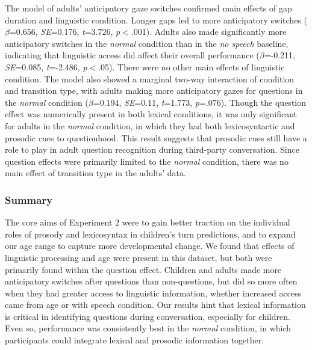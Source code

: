 \documentclass[authoryear, 12pt]{elsarticle}
\begin{document}
The model of adults' anticipatory gaze switches confirmed main effects of gap duration and linguistic condition. Longer gaps led to more anticipatory switches (\textit{$\beta$}=0.656, \textit{SE}=0.176, \textit{t}=3.726, \textit{p}$<$.001). Adults also made significantly more anticipatory switches in the \textit{normal} condition than in the \textit{no speech} baseline, indicating that linguistic access did affect their overall performance (\textit{$\beta$}=-0.211, \textit{SE}=0.085, \textit{t}=-2.486, \textit{p}$<$.05). There were no other main effects of linguistic condition. The model also showed a marginal two-way interaction of condition and transition type, with adults making more anticipatory gazes for questions in the \textit{normal} condition (\textit{$\beta$}=0.194, \textit{SE}=0.11, \textit{t}=1.773, \textit{p}=.076). Though the question effect was numerically present in both lexical conditions, it was only significant for adults in the \textit{normal} condition, in which they had both lexicosyntactic and prosodic cues to questionhood. This result suggests that prosodic cues still have a role to play in adult question recognition during third-party conversation. Since question effects were primarily limited to the \textit{normal} condition, there was no main effect of transition type in the adults' data.

\subsubsection{Summary}

The core aims of Experiment 2 were to gain better traction on the individual roles of prosody and lexicosyntax in children's turn predictions, and to expand our age range to capture more developmental change. We found that effects of linguistic processing and age were present in this dataset, but both were primarily found within the question effect. Children and adults made more anticipatory switches after questions than non-questions, but did so more often when they had greater access to linguistic information, whether increased access came from age or with speech condition. Our results hint that lexical information is critical in identifying questions during conversation, especially for children. Even so, performance was consistently best in the \textit{normal} condition, in which participants could integrate lexical and prosodic information together.
\end{document}
